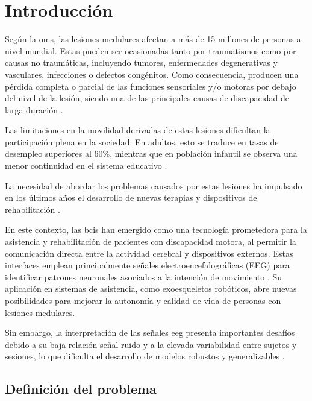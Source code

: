 \section{Introducción} \label{sec:introduccion}
Según la \gls{oms}, las lesiones medulares afectan a más de 15 millones de personas a nivel mundial. Estas pueden ser ocasionadas tanto por traumatismos como por causas no traumáticas, incluyendo tumores, enfermedades degenerativas y vasculares, infecciones o defectos congénitos. Como consecuencia, producen una pérdida completa o parcial de las funciones sensoriales y/o motoras por debajo del nivel de la lesión, siendo una de las principales causas de discapacidad de larga duración \cite{worldhealthorganizationwho_LesionMedula2024}.

Las limitaciones en la movilidad derivadas de estas lesiones dificultan la participación plena en la sociedad. En adultos, esto se traduce en tasas de desempleo superiores al \(60\%\), mientras que en población infantil se observa una menor continuidad en el sistema educativo \cite{worldhealthorganizationwho_LesionMedula2024,bravo_ExclusionSocial2017}.

La necesidad de abordar los problemas causados por estas lesiones ha impulsado en los últimos años el desarrollo de nuevas terapias y dispositivos de rehabilitación \cite{morone_NeurorehabilitationInsights2025}.

En este contexto, las \gls{bcis} han emergido como una tecnología prometedora para la asistencia y rehabilitación de pacientes con discapacidad motora, al permitir la comunicación directa entre la actividad cerebral y dispositivos externos. Estas interfaces emplean principalmente señales electroencefalográficas (EEG) para identificar patrones neuronales asociados a la intención de movimiento \cite{sadiq_ExploitingPretrained2022}. Su aplicación en sistemas de asistencia, como exoesqueletos robóticos, abre nuevas posibilidades para mejorar la autonomía y calidad de vida de personas con lesiones medulares.

Sin embargo, la interpretación de las señales \acrshort{eeg} presenta importantes desafíos debido a su baja relación señal-ruido y a la elevada variabilidad entre sujetos y sesiones, lo que dificulta el desarrollo de modelos robustos y generalizables \cite{yun_AdvancesChallenges2024}.

\subsection{Definición del problema}

